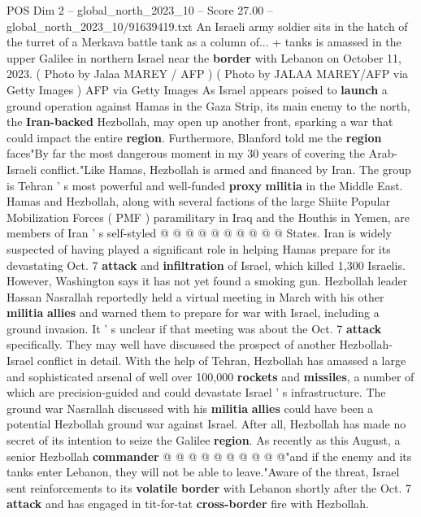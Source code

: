 \begin{textsample}{POS Dim 2 – global\_north\_2023\_10 – Score 27.00 – global\_north\_2023\_10/91639419.txt}  \label{ex:f2_pos_141}
An Israeli army soldier sits in the hatch of the turret of a Merkava battle tank as a column of... + tanks is amassed in the upper Galilee in northern Israel near the \textbf{border} with Lebanon on October 11, 2023. ( Photo by Jalaa MAREY / AFP ) ( Photo by JALAA MAREY/AFP via Getty Images ) AFP via Getty Images As Israel appears poised to \textbf{launch} a ground operation against Hamas in the Gaza Strip, its main enemy to the north, the \textbf{Iran-backed} Hezbollah, may open up another front, sparking a war that could impact the entire \textbf{region}.
Furthermore, Blanford told me the \textbf{region} faces"By far the most dangerous moment in my 30 years of covering the Arab-Israeli conflict."Like Hamas, Hezbollah is armed and financed by Iran.
The group is Tehran ' s most powerful and well-funded \textbf{proxy} \textbf{militia} in the Middle East.
Hamas and Hezbollah, along with several factions of the large Shiite Popular Mobilization Forces ( PMF ) paramilitary in Iraq and the Houthis in Yemen, are members of Iran ' s self-styled @ @ @ @ @ @ @ @ @ @ States.
Iran is widely suspected of having played a significant role in helping Hamas prepare for its devastating Oct. 7 \textbf{attack} and \textbf{infiltration} of Israel, which killed 1,300 Israelis.
However, Washington says it has not yet found a smoking gun.
Hezbollah leader Hassan Nasrallah reportedly held a virtual meeting in March with his other \textbf{militia} \textbf{allies} and warned them to prepare for war with Israel, including a ground invasion.
It ' s unclear if that meeting was about the Oct. 7 \textbf{attack} specifically.
They may well have discussed the prospect of another Hezbollah-Israel conflict in detail.
With the help of Tehran, Hezbollah has amassed a large and sophisticated arsenal of well over 100,000 \textbf{rockets} and \textbf{missiles}, a number of which are precision-guided and could devastate Israel ' s infrastructure.
The ground war Nasrallah discussed with his \textbf{militia} \textbf{allies} could have been a potential Hezbollah ground war against Israel.
After all, Hezbollah has made no secret of its intention to seize the Galilee \textbf{region}.
As recently as this August, a senior Hezbollah \textbf{commander} @ @ @ @ @ @ @ @ @ @"and if the enemy and its tanks enter Lebanon, they will not be able to leave."Aware of the threat, Israel sent reinforcements to its \textbf{volatile} \textbf{border} with Lebanon shortly after the Oct. 7 \textbf{attack} and has engaged in tit-for-tat \textbf{cross-border} fire with Hezbollah.

\end{textsample}
